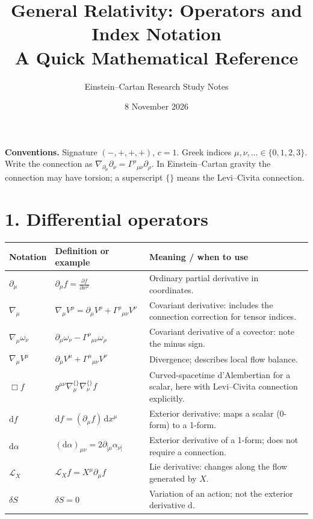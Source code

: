 \documentclass[10pt,a4paper]{article}
\title{\vspace{-14mm}\textbf{General Relativity: Operators and Index Notation}\\\large A Quick Mathematical Reference}
\author{Einstein--Cartan Research Study Notes}
\date{8 November 2026}
\begin{document}
\maketitle\vspace{-4mm}
\noindent\textbf{Conventions.} Signature $(-,+,+,+)$, $c=1$. Greek indices $\mu,\nu,\ldots\in\{0,1,2,3\}$. Write the connection as $\nabla_{\partial_\mu}\partial_\nu=\Gamma^\rho{}_{\mu\nu}\partial_\rho$. In Einstein--Cartan gravity the connection may have torsion; a superscript $\{\}$ means the Levi--Civita connection.
\section*{1. Differential operators}
\renewcommand{\arraystretch}{1.38}
\begin{tabular}{@{}p{.18\linewidth}p{.34\linewidth}p{.43\linewidth}@{}}
\toprule
\textbf{Notation} & \textbf{Definition or example} & \textbf{Meaning / when to use}\\\midrule
$\partial_\mu$ & $\partial_\mu f=\frac{\partial f}{\partial x^\mu}$ & Ordinary partial derivative in coordinates.\\
$\nabla_\mu$ & $\nabla_\mu V^\rho=\partial_\mu V^\rho+\Gamma^\rho{}_{\mu\nu}V^\nu$ & Covariant derivative: includes the connection correction for tensor indices.\\
$\nabla_\mu \omega_\nu$ & $\partial_\mu\omega_\nu-\Gamma^\rho{}_{\mu\nu}\omega_\rho$ & Covariant derivative of a covector: note the minus sign.\\
$\nabla_\mu V^\mu$ & $\partial_\mu V^\mu+\Gamma^\mu{}_{\mu\nu}V^\nu$ & Divergence; describes local flow balance.\\
$\Box f$ & $g^{\mu\nu}\nabla^{\{\}}_\mu\nabla^{\{\}}_\nu f$ & Curved-spacetime d'Alembertian for a scalar, here with Levi--Civita connection explicitly.\\
$\mathrm d f$ & $\mathrm d f=(\partial_\mu f)\,\mathrm d x^\mu$ & Exterior derivative: maps a scalar (0-form) to a 1-form.\\
$\mathrm d\alpha$ & $(\mathrm d\alpha)_{\mu\nu}=2\partial_{[\mu}\alpha_{\nu]}$ & Exterior derivative of a 1-form; does not require a connection.\\
$\mathcal L_X$ & $\mathcal L_X f=X^\mu\partial_\mu f$ & Lie derivative: changes along the flow generated by $X$.\\
$\delta S$ & $\delta S=0$ & Variation of an action; not the exterior derivative $\mathrm d$.\\\bottomrule
\end{tabular}
\end{document}
